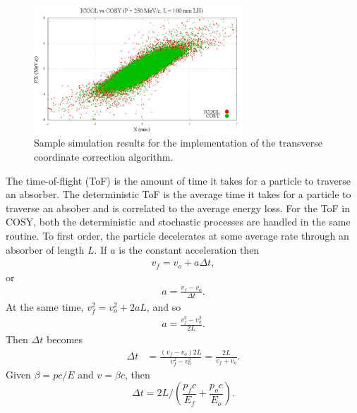 \begin{figure}[H]
  \centering
    \includegraphics[width=0.7\textwidth]{Figures/xpx_phase_space_implemented} 
  \caption{Sample simulation results for the implementation of the transverse coordinate correction algorithm.}
  \label{fig:xpx_phase_space_implemented}
\end{figure}
%
%
\label{sec:COSYTemporalDisplacement}\par
The time-of-flight (ToF) is the amount of time it takes for a particle to traverse an absorber. The deterministic ToF is the average time it takes for a particle to traverse an absober and is correlated to the average energy loss. For the ToF in COSY, both the deterministic and stochastic processes are handled in the same routine. To first order, the particle decelerates at some  average rate through an absorber of length $L$. If $a$ is the constant acceleration then 
\begin{align*}
v_f=v_o+a\Delta t,
\end{align*}
or 
\begin{align*}
a=\frac{v_f-v_o}{\Delta t}.
\end{align*}
At the same time, $v_f ^2 = v_o ^2 + 2 a L$, and so
\begin{align*}
 a=\frac{v_f ^2 - v_o ^2}{2L}.
\end{align*}
Then $\Delta t$ becomes
\begin{align*}
\Delta t &= \frac{(v_f-v_o)2L}{v_f^2-v_o^2}=\frac{2L}{v_f+v_o}.
\end{align*}
Given $\beta=pc/E$ and $v=\beta c$, then
\begin{equation}\label{eqn:cosyDeltaT}
\Delta t=2L/\left(\frac{p_f c}{E_f}+\frac{p_o c}{E_o}\right).
\end{equation}

